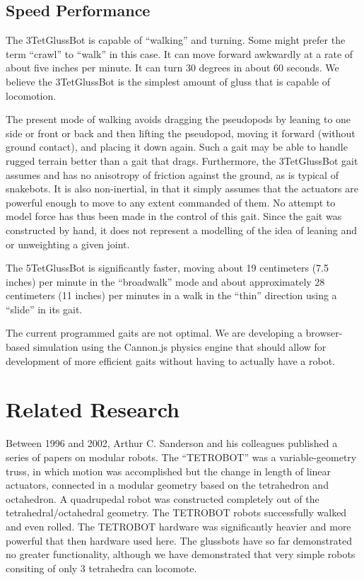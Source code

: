 \documentclass[11pt]{article}
\begin{document}
\subsection{Speed Performance}

The 3TetGlussBot is capable of ``walking'' and turning. Some might prefer the term ``crawl'' to ``walk'' in
this case. It can move forward awkwardly at a rate
of about five inches per minute. It can turn 30 degrees in about 60 seconds.
We believe the 3TetGlussBot is the simplest amount of gluss that is capable of locomotion.

The present mode of walking avoids dragging the pseudopods by leaning to one side or front or back and
then lifting the pseudopod, moving it forward (without ground contact), and placing it down again.
Such a gait may be able to handle rugged terrain better than a gait that drags. Furthermore, the
3TetGlussBot gait assumes and has no anisotropy of friction against the ground, as is typical
of snakebots.
It is also non-inertial, in that it simply assumes that the actuators are powerful enough to
move to any extent commanded of them. No attempt to model force has thus been made in the control of this gait.
Since the gait was constructed by hand, it does not represent a modelling of the idea of leaning and or
unweighting a given joint.

The 5TetGlussBot is significantly faster, moving about 19 centimeters (7.5 inches)
per minute in the ``broadwalk'' mode
and about approximately 28 centimeters (11 inches) per minutes in a walk in the ``thin'' direction using a ``slide'' in its gait.

The current programmed gaits are not optimal.
We are developing a browser-based simulation using the Cannon.js physics engine that should allow for development
of more efficient gaits without having to actually have a robot.

\section{Related Research}

Between 1996 and 2002, Arthur C. Sanderson and his colleagues published a series of
papers\cite{sanderson1996modular,lee2002dynamic,lee1999dynamics} on modular robots.
The ``TETROBOT'' was a variable-geometry truss, in which motion was accomplished but the change
in length of linear actuators, connected in a modular geometry based on the tetrahedron and octahedron.
A quadrupedal robot was constructed completely out of the tetrahedral/octahedral geometry.
The TETROBOT robots successfully walked and even rolled. The TETROBOT hardware was significantly
heavier and more powerful that then hardware used here. The glussbots have so far demonstrated no greater functionality,
although we have demonstrated that very simple robots consiting of only 3 tetrahedra can locomote.
\end{document}
